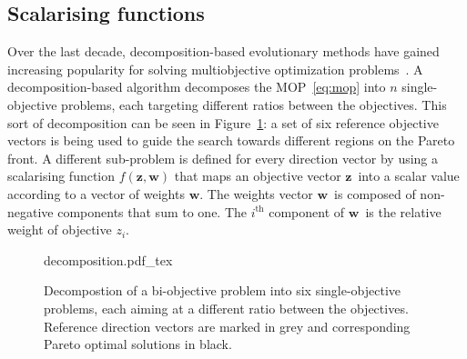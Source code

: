 \documentclass[10pt]{llncs}
\newcommand{\brr}[1]{{\left({#1}\right)}} %
\newcommand{\vz}{\ensuremath{\mathbf{z}}} %
\newcommand{\vw}{\ensuremath{\mathbf{w}}} %
\begin{document}
\subsection{Scalarising functions}
\label{subsec:Scalarising}
Over the last decade, decomposition-based evolutionary methods have gained increasing popularity for solving multiobjective optimization problems~\cite{Giagkiozis2013Overview}. A decomposition-based algorithm decomposes the MOP~\eqref{eq:mop} into $n$ single-objective problems, each targeting different ratios between the objectives. This sort of decomposition can be seen in Figure~\ref{fig:decomposition}: a set of six reference objective vectors is being used to guide the search towards different regions on the Pareto front. A different sub-problem is defined for every direction vector by using a scalarising function $f\brr{\vz,\vw}$ that maps an objective vector \vz\ into a scalar value according to a vector of weights \vw. The weights vector \vw\ is composed of non-negative components that sum to one.
The $i^\text{th}$ component of \vw\ is the relative weight of objective $z_i$.

\begin{figure}
	\centering
	\def\svgwidth{0.4\textwidth}
	{decomposition.pdf_tex}
	\caption{Decompostion of a bi-objective problem into six single-objective problems, each aiming at a different ratio between the objectives.
	Reference direction vectors are marked in grey and corresponding Pareto optimal solutions in black.}
	\label{fig:decomposition}
\end{figure}
\end{document}
